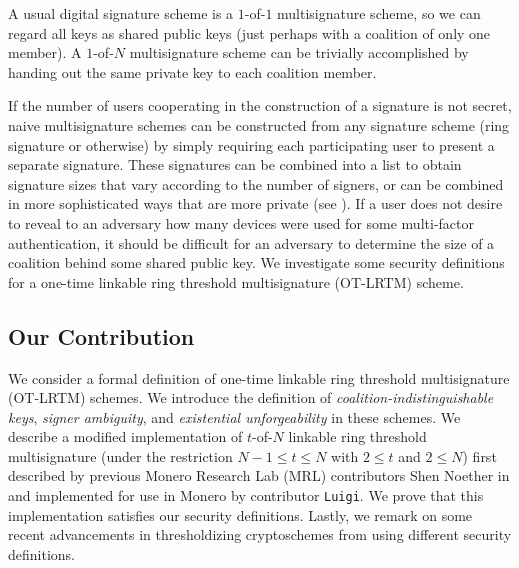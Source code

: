 \documentclass{mrl}
\theoremstyle{definition}
\begin{document}
A usual digital signature scheme is a $1$-of-$1$ multisignature scheme, so we can regard all keys as shared public keys (just perhaps with a coalition of only one member). A $1$-of-$N$ multisignature scheme can be trivially accomplished by handing out the same private key to each coalition member. 

If the number of users cooperating in the construction of a signature is not secret, naive multisignature schemes can be constructed from any signature scheme (ring signature or otherwise) by simply requiring each participating user to present a separate signature. These signatures can be combined into a list to obtain signature sizes that vary according to the number of signers, or can be combined in more sophisticated ways that are more private (see \cite{bonehthreshold}).  If a user does not desire to reveal to an adversary how many devices were used for some multi-factor authentication, it should be difficult for an adversary to determine the size of a coalition behind some shared public key. We investigate some security definitions for a one-time linkable ring threshold multisignature (OT-LRTM) scheme.





\subsection{Our Contribution}


We consider a formal definition of one-time linkable ring threshold multisignature (OT-LRTM) schemes. We introduce the definition of \textit{coalition-indistinguishable keys}, \textit{signer ambiguity}, and \textit{existential unforgeability} in these schemes. We describe a modified implementation of $t$-of-$N$ linkable ring threshold multisignature (under the restriction $N-1 \leq t \leq N$ with $2 
\leq t$ and $2 \leq N$) first described by previous Monero Research Lab (MRL) contributors Shen Noether in \cite{noether2016ring} and implemented for use in Monero by contributor \texttt{Luigi}. We prove that this implementation satisfies our security definitions. Lastly, we remark on some recent advancements in thresholdizing cryptoschemes from \cite{bonehthreshold} using different security definitions.
\end{document}
